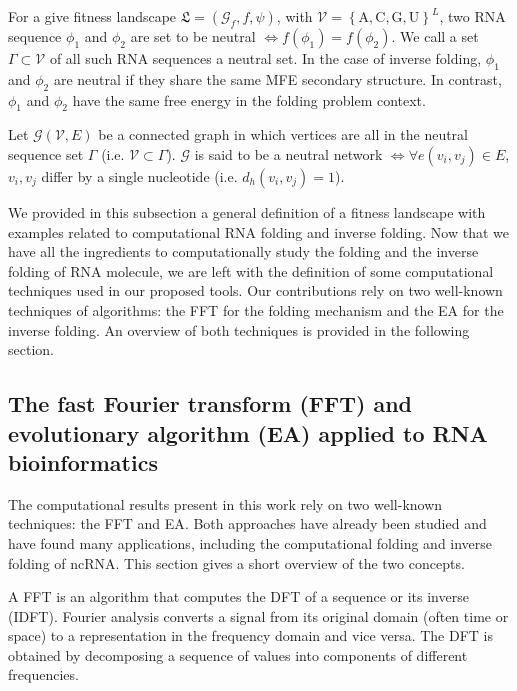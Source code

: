 \begin{mydef}
	\label{def:neutral_set}
	For a give fitness landscape $\mathfrak{L} = (\mathcal{G}_f, f, \psi)$, with $\mathcal{V} = \left\{ \text{A}, \text{C}, \text{G}, \text{U} \right\}^L$, two \ac{RNA} sequence $\phi_1$ and $\phi_2$  are set to be neutral $\iff f(\phi_1) = f(\phi_2)$. We call a set $\Gamma \subset \mathcal{V}$ of all such \ac{RNA} sequences a neutral set.  In the case of inverse folding, $\phi_1$ and $\phi_2$ are neutral if they share the same \ac{MFE} secondary structure. In contrast, $\phi_1$ and $\phi_2$ have the same free energy in the folding problem context. 
\end{mydef}

\begin{mydef}
	\label{def:neutral_net}
	Let $\mathcal{G} (\mathcal{V}, E)$ be a connected graph in which vertices are all in the neutral sequence set $\Gamma$ (i.e. $\mathcal{V} \subset \Gamma$).  $\mathcal{G}$ is said to be a neutral network $\iff \forall e(v_i, v_j) \in E $,  $v_i,v_j$ differ by a single nucleotide (i.e. $d_h(v_i, v_j)=1$).
\end{mydef}

We provided in this subsection a general definition of a fitness landscape with examples related to computational \ac{RNA} folding and inverse folding. Now that we have all the ingredients to computationally study the folding and the inverse folding of \ac{RNA} molecule, we are left with the definition of some computational techniques used in our proposed tools. Our contributions rely on two well-known techniques of algorithms: the \ac{FFT} for the folding mechanism and the \ac{EA} for the inverse folding. An overview of both techniques is provided in the following section.
\subsection{The fast Fourier transform (FFT) and evolutionary algorithm (EA) applied to RNA bioinformatics}
The computational results present in this work rely on two well-known techniques: the \ac{FFT} and \ac{EA}. Both approaches have already been studied and have found many applications, including the computational folding and inverse folding of \ac{ncRNA}. This section gives a short overview of the two concepts. 

A \ac{FFT} is an algorithm that computes the \ac{DFT} of a sequence or its inverse (\ac{IDFT}). Fourier analysis converts a signal from its original domain (often time or space) to a representation in the frequency domain and vice versa. The \ac{DFT} is obtained by decomposing a sequence of values into components of different frequencies. 

